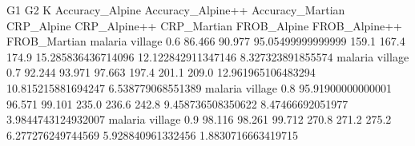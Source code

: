 G1 G2 K Accuracy_Alpine Accuracy_Alpine++ Accuracy_Martian CRP_Alpine CRP_Alpine++ CRP_Martian FROB_Alpine FROB_Alpine++ FROB_Martian
malaria village 0.6 86.466 90.977 95.05499999999999 159.1 167.4 174.9 15.285836436714096 12.122842911347146 8.327323891855574
malaria village 0.7 92.244 93.971 97.663 197.4 201.1 209.0 12.961965106483294 10.815215881694247 6.538779068551389
malaria village 0.8 95.91900000000001 96.571 99.101 235.0 236.6 242.8 9.458736508350622 8.47466692051977 3.9844743124932007
malaria village 0.9 98.116 98.261 99.712 270.8 271.2 275.2 6.277276249744569 5.928840961332456 1.8830716663419715
